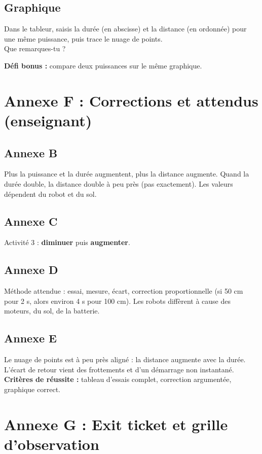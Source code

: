 \documentclass[11pt,a4paper]{article}
\begin{document}
\subsection*{Graphique}
Dans le tableur, saisis la durée (en abscisse) et la distance (en ordonnée) pour une même puissance, puis trace le nuage de points.\\
Que remarques-tu ? \lig

\textbf{Défi bonus :} compare deux puissances sur le même graphique.

\newpage
\section*{Annexe F : Corrections et attendus (enseignant)}

\subsection*{Annexe B}
Plus la puissance et la durée augmentent, plus la distance augmente. Quand la durée double, la distance double à peu près (pas exactement). Les valeurs dépendent du robot et du sol.

\subsection*{Annexe C}
Activité 3 : \textbf{diminuer} puis \textbf{augmenter}.

\subsection*{Annexe D}
Méthode attendue : essai, mesure, écart, correction proportionnelle (si 50 cm pour 2 s, alors environ 4 s pour 100 cm). Les robots diffèrent à cause des moteurs, du sol, de la batterie.

\subsection*{Annexe E}
Le nuage de points est à peu près aligné : la distance augmente avec la durée. L'écart de retour vient des frottements et d'un démarrage non instantané.\\
\textbf{Critères de réussite :} tableau d'essais complet, correction argumentée, graphique correct.

\newpage
\section*{Annexe G : Exit ticket et grille d'observation}
\end{document}
